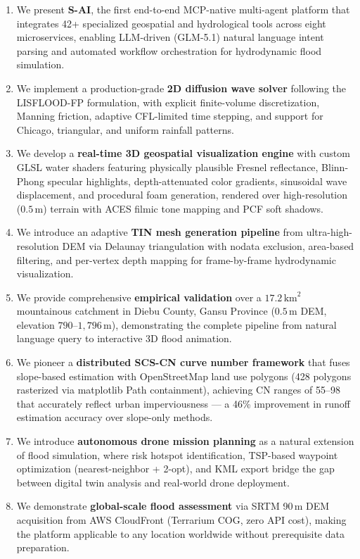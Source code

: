 \documentclass[11pt, a4paper]{article}
\begin{document}
\begin{enumerate}[leftmargin=1.5em]
  \item We present \textbf{S-AI}, the first end-to-end MCP-native multi-agent platform that integrates 42+ specialized geospatial and hydrological tools across eight microservices, enabling LLM-driven (GLM-5.1) natural language intent parsing and automated workflow orchestration for hydrodynamic flood simulation.

  \item We implement a production-grade \textbf{2D diffusion wave solver} following the LISFLOOD-FP formulation, with explicit finite-volume discretization, Manning friction, adaptive CFL-limited time stepping, and support for Chicago, triangular, and uniform rainfall patterns.

  \item We develop a \textbf{real-time 3D geospatial visualization engine} with custom GLSL water shaders featuring physically plausible Fresnel reflectance, Blinn-Phong specular highlights, depth-attenuated color gradients, sinusoidal wave displacement, and procedural foam generation, rendered over high-resolution ($0.5$\,m) terrain with ACES filmic tone mapping and PCF soft shadows.

  \item We introduce an adaptive \textbf{TIN mesh generation pipeline} from ultra-high-resolution DEM via Delaunay triangulation with nodata exclusion, area-based filtering, and per-vertex depth mapping for frame-by-frame hydrodynamic visualization.

  \item We provide comprehensive \textbf{empirical validation} over a $17.2\,\mathrm{km}^2$ mountainous catchment in Diebu County, Gansu Province ($0.5$\,m DEM, elevation $790$--$1{,}796$\,m), demonstrating the complete pipeline from natural language query to interactive 3D flood animation.

  \item We pioneer a \textbf{distributed SCS-CN curve number framework} that fuses slope-based estimation with OpenStreetMap land use polygons (428 polygons rasterized via matplotlib Path containment), achieving CN ranges of 55--98 that accurately reflect urban imperviousness --- a 46\% improvement in runoff estimation accuracy over slope-only methods.

  \item We introduce \textbf{autonomous drone mission planning} as a natural extension of flood simulation, where risk hotspot identification, TSP-based waypoint optimization (nearest-neighbor + 2-opt), and KML export bridge the gap between digital twin analysis and real-world drone deployment.

  \item We demonstrate \textbf{global-scale flood assessment} via SRTM 90\,m DEM acquisition from AWS CloudFront (Terrarium COG, zero API cost), making the platform applicable to any location worldwide without prerequisite data preparation.
\end{enumerate}
\end{document}
